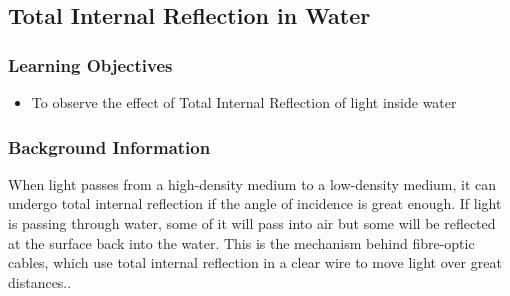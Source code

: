 
	


\subsection{Total Internal Reflection in Water}

\subsubsection*{Learning Objectives}
\begin{itemize}
\item{To observe the effect of Total Internal Reflection of light inside water}
\end{itemize}

\subsubsection*{Background Information}
When light passes from a high-density medium to a low-density medium, it can undergo total internal reflection if the angle of incidence is great enough.  If light is passing through water, some of it will pass into air but some will be reflected at the surface back into the water.  This is the mechanism behind fibre-optic cables, which use total internal reflection in a clear wire to move light over great distances..

